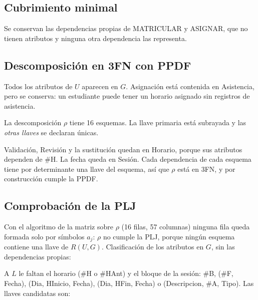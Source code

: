 \subsection{Cubrimiento minimal}\label{sec:cubrimiento}

Se conservan las dependencias propias de MATRICULAR y ASIGNAR, que no tienen atributos y ninguna otra dependencia las representa.



\subsection{Descomposición en 3FN con PPDF}\label{sec:descomposicion}

Todos los atributos de $U$ aparecen en $G$. Asignación está contenida en Asistencia, pero se conserva: un estudiante puede tener un horario asignado sin registros de asistencia.



La descomposición $\rho$ tiene 16 esquemas. La llave primaria está subrayada y las \emph{otras llaves} se declaran únicas.



Validación, Revisión y la sustitución quedan en Horario, porque sus atributos dependen de \#H. La fecha queda en Sesión. Cada dependencia de cada esquema tiene por determinante una llave del esquema, así que $\rho$ está en 3FN, y por construcción cumple la PPDF.

\subsection{Comprobación de la PLJ}\label{sec:plj}

Con el algoritmo de la matriz sobre $\rho$ (16 filas, 57 columnas) ninguna fila queda formada solo por símbolos $a_j$: $\rho$ no cumple la PLJ, porque ningún esquema contiene una llave de $R(U, G)$. Clasificación de los atributos en $G$, sin las dependencias propias:





A $L$ le faltan el horario (\#H o \#HAnt) y el bloque de la sesión: \#B, (\#F, Fecha), (Dia, HInicio, Fecha), (Dia, HFin, Fecha) o (Descripcion, \#A, Tipo). Las llaves candidatas son:



